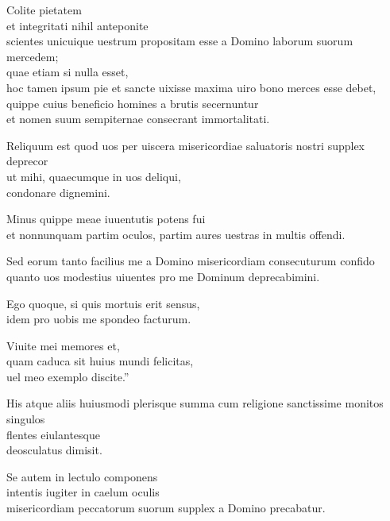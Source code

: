 \documentclass[a5paper,twoside]{article}
\begin{document}
Colite pietatem \\
et integritati nihil anteponite \\
scientes unicuique uestrum propositam esse a Domino laborum suorum mercedem; \\
quae etiam si nulla esset, \\
hoc tamen ipsum pie et sancte uixisse maxima uiro bono merces esse debet, \\
quippe cuius beneficio homines a brutis secernuntur \\
et nomen suum sempiternae consecrant immortalitati.

Reliquum est quod uos per uiscera misericordiae saluatoris nostri supplex deprecor \\
ut mihi, quaecumque in uos deliqui, \\
condonare dignemini.

Minus quippe meae iuuentutis potens fui \\
et nonnunquam partim oculos, partim aures uestras in multis offendi.

Sed eorum tanto facilius me a Domino misericordiam consecuturum confido \\
quanto uos modestius uiuentes pro me Dominum deprecabimini. 

Ego quoque, si quis mortuis erit sensus, \\
idem pro uobis me spondeo facturum.

Viuite mei memores et, \\
quam caduca sit huius mundi felicitas, \\
uel meo exemplo discite.''

His atque aliis huiusmodi plerisque summa cum religione sanctissime monitos singulos \\
flentes eiulantesque \\
deosculatus dimisit.

Se autem in lectulo componens \\
intentis iugiter in caelum oculis \\
misericordiam peccatorum suorum supplex a Domino precabatur. 
\end{document}
